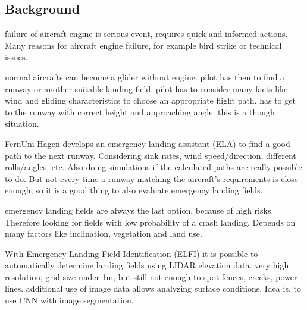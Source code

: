 \subsection{Background}
\cite{feu_fas}
failure of aircraft engine is serious event, requires quick and informed actions. Many reasons for aircraft engine failure, for example bird strike or technical issues.

normal aircrafts can become a glider without engine. pilot has then to find a runway or another suitable landing field. pilot has to consider many facts like wind and gliding characteristics to choose an appropriate flight path. has to get to the runway with correct height and approaching angle. this is a though situation.

FernUni Hagen develops an emergency landing assistant (ELA) to find a good path to the next runway. Considering sink rates, wind speed/direction, different rolls/angles, etc. Also doing simulations if the calculated paths are really possible to do. But not every time a runway matching the aircraft's requirements is close enough, so it is a good thing to also evaluate emergency landing fields.


\cite{feu_elfi}
emergency landing fields are always the last option, because of high risks. Therefore looking for fields with low probability of a crash landing. Depends on many factors like inclination, vegetation and land use.

With Emergency Landing Field Identification (ELFI) it is possible to automatically determine landing fields using LIDAR elevation data. very high resolution, grid size under 1m, but still not enough to spot fences, creeks, power lines. additional use of image data allows analyzing surface conditions. Idea is, to use CNN with image segmentation.


